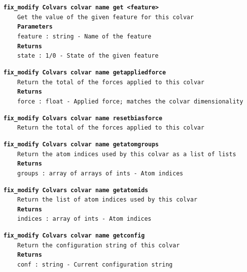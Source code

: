 \begin{mdexampleinput}{}
\texttt{\textbf{fix\_modify Colvars colvar name get <feature>}}
\\
\-~~~~\texttt{Get the value of the given feature for this colvar}
\\
\-~~~~\texttt{\textbf{Parameters}}
\\
\-~~~~\texttt{feature : string - Name of the feature}
\\
\-~~~~\texttt{\textbf{Returns}}
\\
\-~~~~\texttt{state : 1/0 - State of the given feature}
\end{mdexampleinput}
\begin{mdexampleinput}{}
\texttt{\textbf{fix\_modify Colvars colvar name getappliedforce}}
\\
\-~~~~\texttt{Return the total of the forces applied to this colvar}
\\
\-~~~~\texttt{\textbf{Returns}}
\\
\-~~~~\texttt{force : float - Applied force; matches the colvar dimensionality}
\end{mdexampleinput}
\begin{mdexampleinput}{}
\texttt{\textbf{fix\_modify Colvars colvar name resetbiasforce}}
\\
\-~~~~\texttt{Return the total of the forces applied to this colvar}
\end{mdexampleinput}
\begin{mdexampleinput}{}
\texttt{\textbf{fix\_modify Colvars colvar name getatomgroups}}
\\
\-~~~~\texttt{Return the atom indices used by this colvar as a list of lists}
\\
\-~~~~\texttt{\textbf{Returns}}
\\
\-~~~~\texttt{groups : array of arrays of ints - Atom indices}
\end{mdexampleinput}
\begin{mdexampleinput}{}
\texttt{\textbf{fix\_modify Colvars colvar name getatomids}}
\\
\-~~~~\texttt{Return the list of atom indices used by this colvar}
\\
\-~~~~\texttt{\textbf{Returns}}
\\
\-~~~~\texttt{indices : array of ints - Atom indices}
\end{mdexampleinput}
\begin{mdexampleinput}{}
\texttt{\textbf{fix\_modify Colvars colvar name getconfig}}
\\
\-~~~~\texttt{Return the configuration string of this colvar}
\\
\-~~~~\texttt{\textbf{Returns}}
\\
\-~~~~\texttt{conf : string - Current configuration string}
\end{mdexampleinput}
